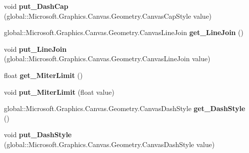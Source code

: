\begin{DoxyCompactItemize}
void {\bfseries put\+\_\+\+Dash\+Cap} (global\+::\+Microsoft.\+Graphics.\+Canvas.\+Geometry.\+Canvas\+Cap\+Style value)
\item 
\mbox{\label{interface_microsoft_1_1_graphics_1_1_canvas_1_1_geometry_1_1_i_canvas_stroke_style_aa99219b6d76643e93de91296b3261eb8}} 
global\+::\+Microsoft.\+Graphics.\+Canvas.\+Geometry.\+Canvas\+Line\+Join {\bfseries get\+\_\+\+Line\+Join} ()
\item 
\mbox{\label{interface_microsoft_1_1_graphics_1_1_canvas_1_1_geometry_1_1_i_canvas_stroke_style_a9917a7ec85d18fa2508e01a5bea88eb8}} 
void {\bfseries put\+\_\+\+Line\+Join} (global\+::\+Microsoft.\+Graphics.\+Canvas.\+Geometry.\+Canvas\+Line\+Join value)
\item 
\mbox{\label{interface_microsoft_1_1_graphics_1_1_canvas_1_1_geometry_1_1_i_canvas_stroke_style_a75a67b6c8e374ada2860deffb62fd790}} 
float {\bfseries get\+\_\+\+Miter\+Limit} ()
\item 
\mbox{\label{interface_microsoft_1_1_graphics_1_1_canvas_1_1_geometry_1_1_i_canvas_stroke_style_a8cae4d32f3a346d5bc506c2e5c172343}} 
void {\bfseries put\+\_\+\+Miter\+Limit} (float value)
\item 
\mbox{\label{interface_microsoft_1_1_graphics_1_1_canvas_1_1_geometry_1_1_i_canvas_stroke_style_a4e200c8b211b9a0372f10cfc99f37f85}} 
global\+::\+Microsoft.\+Graphics.\+Canvas.\+Geometry.\+Canvas\+Dash\+Style {\bfseries get\+\_\+\+Dash\+Style} ()
\item 
\mbox{\label{interface_microsoft_1_1_graphics_1_1_canvas_1_1_geometry_1_1_i_canvas_stroke_style_a3a3866d0af05bea0d5111d39bad2f7aa}} 
void {\bfseries put\+\_\+\+Dash\+Style} (global\+::\+Microsoft.\+Graphics.\+Canvas.\+Geometry.\+Canvas\+Dash\+Style value)
\item 
\mbox{\label{interface_microsoft_1_1_graphics_1_1_canvas_1_1_geometry_1_1_i_canvas_stroke_style_a261cdb6c0132a1ce93c7ecd652c1956d}} 

\end{DoxyCompactItemize}
